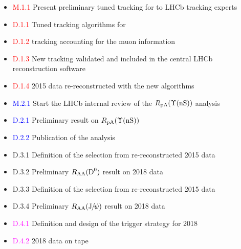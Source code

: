 \documentclass[a4paper,11pt]{article}
\begin{document}
\begin{itemize}
 \item \textcolor{red}{M.1.1} Present preliminary tuned tracking for \pbpb to LHCb tracking experts
 \item \textcolor{red}{D.1.1} Tuned tracking algorithms for \pbpb
 \item \textcolor{red}{D.1.2} \pbpb tracking accounting for the muon information
 \item \textcolor{red}{D.1.3} New \pbpb tracking validated and included in the central LHCb reconstruction software
 \item \textcolor{red}{D.1.4} 2015 data re-reconstructed with the new algorithms
 \item \textcolor{blue}{M.2.1} Start the LHCb internal review of the $R_{\text{pA}} (\Upsilon\text{(nS)})$ analysis
 \item \textcolor{blue}{D.2.1} Preliminary result on $R_{\text{pA}} (\Upsilon\text{(nS)})$
 \item \textcolor{blue}{D.2.2} Publication of the analysis
 \item \textcolor{green!50!black}{D.3.1} Definition of the \Dz selection from re-reconstructed 2015 \pbpb data
 \item \textcolor{green!50!black}{D.3.2} Preliminary $R_{\text{AA}}(\text{D}^0)$ result on 2018 \pbpb data
 \item \textcolor{green!50!black}{D.3.3} Definition of the \Jpsi selection from re-reconstructed 2015 \pbpb data
 \item \textcolor{green!50!black}{D.3.4} Preliminary $R_{\text{AA}}(\text{J}\hspace{-.08em}/\hspace{-.14em}\psi)$ result on 2018 \pbpb data
 \item \textcolor{magenta}{D.4.1} Definition and design of the trigger strategy for 2018 \pbpb
 \item \textcolor{magenta}{D.4.2} 2018 \pbpb data on tape
\end{itemize}
\end{document}

